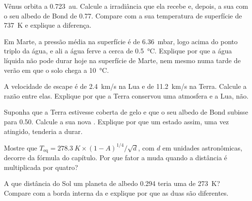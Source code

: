 \begin{exercise}[$\star\star$]\label{exo:g10:habitable-planet:8}
Vênus orbita a \qty{0.723}{au}. Calcule a irradiância que ela recebe e,
depois, a sua  com o seu albedo de Bond de 0.77.
Compare com a sua temperatura de superfície de \qty{737}{K} e explique a
diferença.
\end{exercise}

\begin{exercise}[$\star\star$]\label{exo:g10:habitable-planet:9}
Em Marte, a pressão média na superfície é de \qty{6.36}{mbar}, logo acima
do ponto triplo da água, e ali a água ferve a cerca de
\qty{0.5}{\degreeCelsius}. Explique por que a água líquida não pode durar
hoje na superfície de Marte, nem mesmo numa tarde de verão em que o solo
chega a \qty{10}{\degreeCelsius}.
\end{exercise}

\begin{exercise}[$\star\star$]\label{exo:g10:habitable-planet:10}
A velocidade de escape é de \qty{2.4}{km/s} na Lua e de \qty{11.2}{km/s}
na Terra. Calcule a razão entre elas. Explique por que a Terra conservou uma
atmosfera e a Lua, não.
\end{exercise}

\begin{exercise}[$\star\star$]\label{exo:g10:habitable-planet:11}
Suponha que a Terra estivesse coberta de gelo e que o seu albedo de Bond
subisse para 0.50. Calcule a sua nova . Explique
por que um estado assim, uma vez atingido, tenderia a durar.
\end{exercise}

\begin{exercise}[$\star\star\star$]\label{exo:g10:habitable-planet:12}
Mostre que $T_{\mathrm{eq}} = \qty{278.3}{K} \times (1-A)^{1/4}/\sqrt{d}$,
com $d$ em unidades astronômicas, decorre da fórmula do capítulo. Por que
fator a  muda quando a distância é multiplicada
por quatro?
\end{exercise}

\begin{exercise}[$\star\star\star$]\label{exo:g10:habitable-planet:13}
A que distância do Sol um planeta de albedo 0.294 teria uma  de \qty{273}{K}? Compare com a borda interna da  e
explique por que as duas são diferentes.
\end{exercise}

